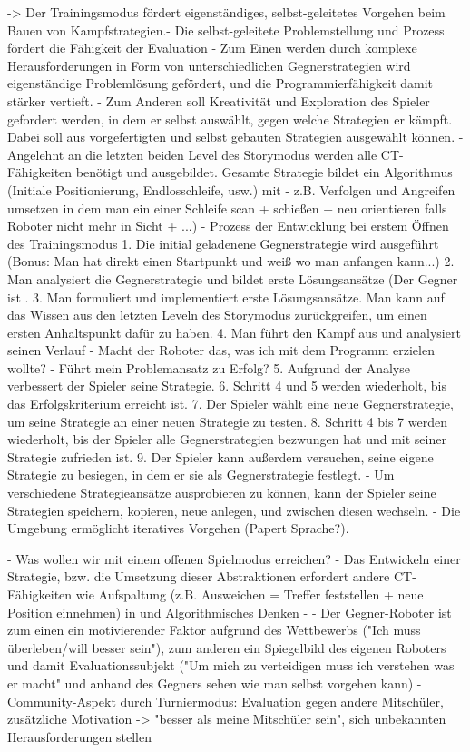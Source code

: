 -> Der Trainingsmodus fördert eigenständiges, selbst-geleitetes Vorgehen beim Bauen von
Kampfstrategien.- Die selbst-geleitete Problemstellung und Prozess fördert die Fähigkeit der Evaluation
- Zum Einen werden durch komplexe Herausforderungen in Form von unterschiedlichen Gegnerstrategien wird eigenständige
Problemlösung gefördert, und die Programmierfähigkeit damit stärker vertieft.
- Zum Anderen soll Kreativität und Exploration des Spieler gefordert werden, in dem er selbst
auswählt, gegen welche Strategien er kämpft. Dabei soll aus vorgefertigten und selbst gebauten
Strategien ausgewählt können.
- Angelehnt an die letzten beiden Level des Storymodus werden alle CT-Fähigkeiten benötigt und
ausgebildet. Gesamte Strategie bildet ein Algorithmus (Initiale Positionierung, Endlosschleife, usw.) mit 
  - z.B. Verfolgen und Angreifen umsetzen in dem man ein einer Schleife scan + schießen + neu orientieren falls Roboter nicht mehr in Sicht + ...)
- Prozess der Entwicklung bei erstem Öffnen des Trainingsmodus
  1. Die initial geladenene Gegnerstrategie wird ausgeführt (Bonus: Man hat direkt einen Startpunkt
  und weiß wo man anfangen kann...)
  2. Man analysiert die Gegnerstrategie und bildet erste Lösungsansätze (Der Gegner ist .
  3. Man formuliert und implementiert erste Lösungsansätze. Man kann auf das Wissen aus den letzten
  Leveln des Storymodus zurückgreifen, um einen ersten Anhaltspunkt dafür zu haben.
  4. Man führt den Kampf aus und analysiert seinen Verlauf
    - Macht der Roboter das, was ich mit dem Programm erzielen wollte?
    - Führt mein Problemansatz zu Erfolg?
  5. Aufgrund der Analyse verbessert der Spieler seine Strategie.
  6. Schritt 4 und 5 werden wiederholt, bis das Erfolgskriterium erreicht ist.
  7. Der Spieler wählt eine neue Gegnerstrategie, um seine Strategie an einer neuen Strategie zu
  testen.
  8. Schritt 4 bis 7 werden wiederholt, bis der Spieler alle Gegnerstrategien bezwungen hat und mit
  seiner Strategie zufrieden ist.
  9. Der Spieler kann außerdem versuchen, seine eigene Strategie zu besiegen, in dem er sie als
  Gegnerstrategie festlegt.
- Um verschiedene Strategieansätze ausprobieren zu können, kann der Spieler seine Strategien
speichern, kopieren, neue anlegen, und zwischen diesen wechseln.
- Die Umgebung ermöglicht iteratives Vorgehen (Papert Sprache?).


- Was wollen wir mit einem offenen Spielmodus erreichen?
- Das Entwickeln einer Strategie, bzw. die Umsetzung dieser Abstraktionen erfordert andere CT-Fähigkeiten wie Aufspaltung (z.B. Ausweichen = Treffer feststellen + neue Position einnehmen) in und Algorithmisches Denken
  - 
- Der Gegner-Roboter ist zum einen ein motivierender Faktor aufgrund des Wettbewerbs ("Ich muss überleben/will besser sein"),
  zum anderen ein Spiegelbild des eigenen Roboters und damit Evaluationssubjekt ("Um mich zu verteidigen muss ich verstehen was er macht" und anhand des Gegners sehen wie man selbst vorgehen kann)
- Community-Aspekt durch Turniermodus: Evaluation gegen andere Mitschüler, zusätzliche Motivation -> "besser als meine Mitschüler sein", sich unbekannten Herausforderungen stellen

